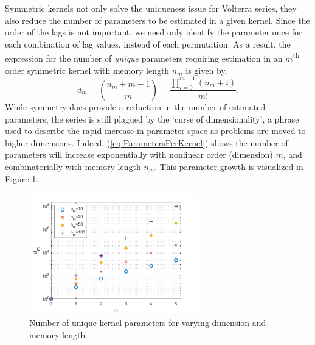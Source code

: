 Symmetric kernels not only solve the uniqueness issue for Volterra series, they also reduce the number of parameters to be estimated in a given kernel. Since the order of the lags is not important, we need only identify the parameter once for each combination of lag values, instead of each permutation. As a result, the expression for the number of \emph{unique} parameters requiring estimation in an $m$\textsuperscript{th} order symmetric kernel with memory length $n_m$ is given by,
\begin{equation} 
\label{eq:ParametersPerKernel}
d_m = \binom{n_m+m-1}{m} = \frac{\prod_{i=0}^{m-1}(n_m + i)}{m!}.
\end{equation}
While symmetry does provide a reduction in the number of estimated parameters, the series is still plagued by the `curse of dimensionality', a phrase used to describe the rapid increase in parameter space as problems are moved to higher dimensions. Indeed, (\ref{eq:ParametersPerKernel}) shows the number of parameters will increase exponentially with nonlinear order (dimension) $m$, and combinatorially with memory length $n_m$. This parameter growth is visualized in Figure \ref{fig:ParameterGrowthCurse}.

\begin{figure}[h]
\centering
\includegraphics[width=0.65\textwidth]{Chapter3_VolterraSeries/ParameterGrowthB.pdf}
\caption{Number of unique kernel parameters for varying dimension and memory length}
\label{fig:ParameterGrowthCurse}
\end{figure}

